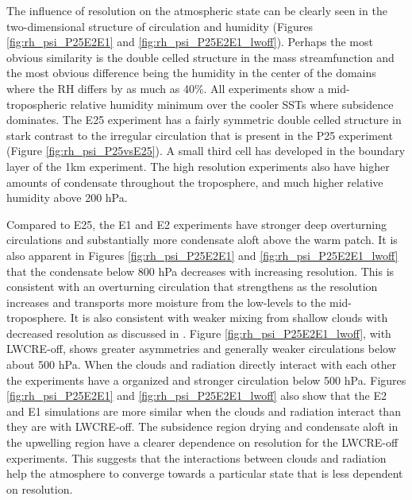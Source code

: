 \documentclass[draft]{agujournal2019}
\begin{document}
{The influence of resolution on the atmospheric state can be clearly seen in the two-dimensional structure 
of circulation and humidity (Figures \ref{fig:rh_psi_P25E2E1} and \ref{fig:rh_psi_P25E2E1_lwoff}).
Perhaps the most obvious similarity is the double celled structure in the mass streamfunction and the most 
obvious difference being the humidity in the center of the domains where the RH differs by as much as 40\%. 
All experiments show a mid-tropospheric relative humidity minimum over the cooler SSTs where subsidence 
dominates.  The E25 experiment has a fairly symmetric double celled structure in stark contrast to the irregular circulation 
that is present in the P25 experiment (Figure \ref{fig:rh_psi_P25vsE25}). 
A small third cell has developed in the boundary layer of the 1km experiment.   The high resolution experiments also have 
higher amounts of condensate throughout the troposphere, and much higher relative humidity 
above 200 hPa. 
 
Compared to E25, the E1 and E2 experiments have stronger deep overturning circulations and substantially 
more condensate aloft above the warm patch.    It is also apparent in Figures 
\ref{fig:rh_psi_P25E2E1} and \ref{fig:rh_psi_P25E2E1_lwoff} that the condensate below 800 hPa 
decreases with increasing resolution.  
This is consistent with an overturning circulation that 
strengthens as the resolution increases and transports more moisture from the low-levels to the 
mid-troposphere.  It is also consistent with weaker mixing from shallow clouds with decreased resolution as
discussed in .   Figure \ref{fig:rh_psi_P25E2E1_lwoff}, with LWCRE-off, shows greater asymmetries 
and generally weaker circulations below about 500 hPa.  
When the clouds and radiation directly interact with each other the experiments have a 
organized and stronger circulation below 500 hPa.  Figures \ref{fig:rh_psi_P25E2E1} and 
\ref{fig:rh_psi_P25E2E1_lwoff} also show that the E2 and E1 simulations are more 
similar when the clouds and radiation interact than they are with LWCRE-off.  The subsidence 
region drying and condensate aloft in the upwelling region have a clearer dependence on resolution for the
LWCRE-off experiments.  This suggests that the interactions between clouds and radiation help the 
atmosphere to converge towards a particular state that is less dependent on resolution.  
  
}
\end{document}
